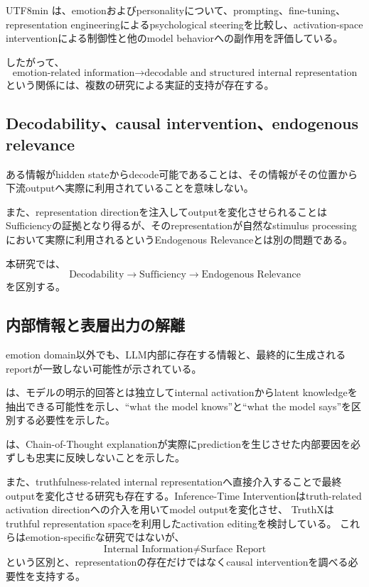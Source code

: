 \documentclass{article} %
\begin{document}
\begin{CJK*}{UTF8}{min}
\citet{banayeeanzade2026psychological}は、emotionおよびpersonalityについて、prompting、fine-tuning、representation engineeringによるpsychological steeringを比較し、activation-space interventionによる制御性と他のmodel behaviorへの副作用を評価している\citep{banayeeanzade2026psychological}。

したがって、
\[
\text{emotion-related information}
\rightarrow
\text{decodable and structured internal representation}
\]
という関係には、複数の研究による実証的支持が存在する。


\subsection{Decodability、causal intervention、endogenous relevance}

ある情報がhidden stateからdecode可能であることは、その情報がその位置から下流outputへ実際に利用されていることを意味しない\citep{hewitt2019designing}。

また、representation directionを注入してoutputを変化させられることはSufficiencyの証拠となり得る\citep{li2023inference,tak2025mechanistic,banayeeanzade2026psychological}が、そのrepresentationが自然なstimulus processingにおいて実際に利用されるというEndogenous Relevanceとは別の問題である。

本研究では、
\[
\text{Decodability}
\rightarrow
\text{Sufficiency}
\rightarrow
\text{Endogenous Relevance}
\]
を区別する。


\subsection{内部情報と表層出力の解離}

emotion domain以外でも、LLM内部に存在する情報と、最終的に生成されるreportが一致しない可能性が示されている。

\citet{burns2022discovering}は、モデルの明示的回答とは独立してinternal activationからlatent knowledgeを抽出できる可能性を示し、``what the model knows''と``what the model says''を区別する必要性を示した\citep{burns2022discovering}。

\citet{turpin2023language}は、Chain-of-Thought explanationが実際にpredictionを生じさせた内部要因を必ずしも忠実に反映しないことを示した\citep{turpin2023language}。

また、truthfulness-related internal representationへ直接介入することで最終outputを変化させる研究も存在する。Inference-Time Interventionはtruth-related activation directionへの介入を用いてmodel outputを変化させ\citep{li2023inference}、
TruthXはtruthful representation spaceを利用したactivation editingを検討している\citep{zhang2024truthx}。
これらはemotion-specificな研究ではないが、
\[
\text{Internal Information}
\neq
\text{Surface Report}
\]
という区別と、representationの存在だけではなくcausal interventionを調べる必要性を支持する。



\end{CJK*}
\end{document}
